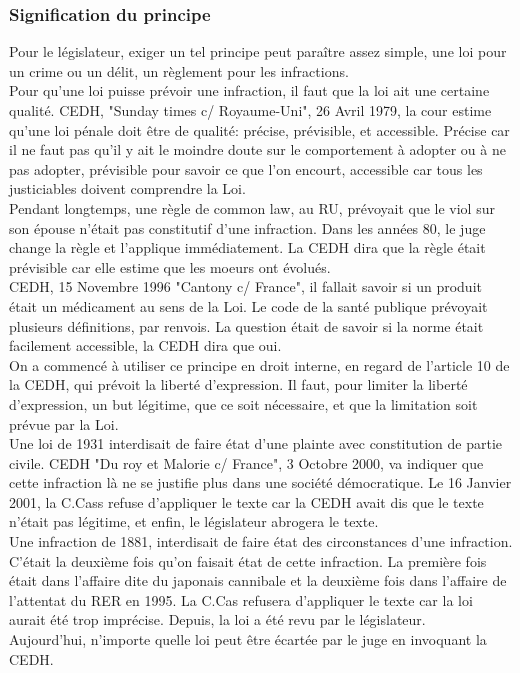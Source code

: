 \documentclass[10pt, a4paper, openany]{book}
\begin{document}
\subsubsection{Signification du principe}

Pour le législateur, exiger un tel principe peut paraître assez simple, une loi pour un crime ou un délit, un règlement pour les infractions. \\
Pour qu'une loi puisse prévoir une infraction, il faut que la loi ait une certaine qualité. CEDH, "Sunday times c/ Royaume-Uni", 26 Avril 1979, la cour estime qu'une loi pénale doit être de qualité: précise, prévisible, et accessible. Précise car il ne faut pas qu'il y ait le moindre doute sur le comportement à adopter ou à ne pas adopter, prévisible pour savoir ce que l'on encourt, accessible car tous les justiciables doivent comprendre la Loi. \\
Pendant longtemps, une règle de common law, au RU, prévoyait que le viol sur son épouse n'était pas constitutif d'une infraction. Dans les années 80, le juge change la règle et l'applique immédiatement. La CEDH dira que la règle était prévisible car elle estime que les moeurs ont évolués. \\
CEDH, 15 Novembre 1996 "Cantony c/ France", il fallait savoir si un produit était un médicament au sens de la Loi. Le code de la santé publique prévoyait plusieurs définitions, par renvois. La question était de savoir si la norme était facilement accessible, la CEDH dira que oui. \\
On a commencé à utiliser ce principe en droit interne, en regard de l'article 10 de la CEDH, qui prévoit la liberté d'expression. Il faut, pour limiter la liberté d'expression, un but légitime, que ce soit nécessaire, et que la limitation soit prévue par la Loi. \\
Une loi de 1931 interdisait de faire état d'une plainte avec constitution de partie civile. CEDH "Du roy et Malorie c/ France", 3 Octobre 2000, va indiquer que cette infraction là ne se justifie plus dans une société démocratique. Le 16 Janvier 2001, la C.Cass refuse d'appliquer le texte car la CEDH avait dis que le texte n'était pas légitime, et enfin, le législateur abrogera le texte. \\
Une infraction de 1881, interdisait de faire état des circonstances d'une infraction. C'était la deuxième fois qu'on faisait état de cette infraction. La première fois était dans l'affaire dite du japonais cannibale et la deuxième fois dans l'affaire de l'attentat du RER en 1995. La C.Cas refusera d'appliquer le texte car la loi aurait été trop imprécise. Depuis, la loi a été revu par le législateur. \\
Aujourd'hui, n'importe quelle loi peut être écartée par le juge en invoquant la CEDH. 
\end{document}
